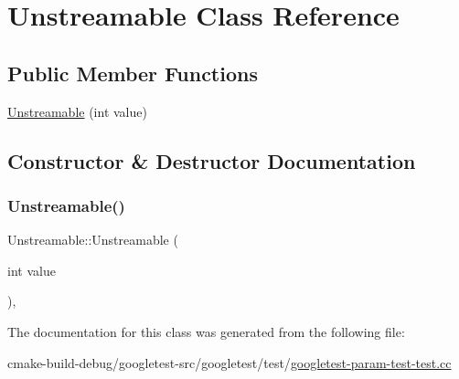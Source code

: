 \hypertarget{classUnstreamable}{}\section{Unstreamable Class Reference}
\label{classUnstreamable}
\subsection*{Public Member Functions}
\begin{DoxyCompactItemize}
\item 
\mbox{\hyperlink{classUnstreamable_aec8af0d0f78468a9094f1b36332a0842}{Unstreamable}} (int value)
\end{DoxyCompactItemize}


\subsection{Constructor \& Destructor Documentation}
\mbox{\label{classUnstreamable_aec8af0d0f78468a9094f1b36332a0842}} 
\subsubsection{\texorpdfstring{Unstreamable()}{Unstreamable()}}
{\footnotesize\ttfamily Unstreamable\+::\+Unstreamable (\begin{DoxyParamCaption}\item[{int}]{value }\end{DoxyParamCaption})\hspace{0.3cm}{\ttfamily [inline]}, {\ttfamily [explicit]}}



The documentation for this class was generated from the following file\+:\begin{DoxyCompactItemize}
\item 
cmake-\/build-\/debug/googletest-\/src/googletest/test/\mbox{\hyperlink{googletest-param-test-test_8cc}{googletest-\/param-\/test-\/test.\+cc}}\end{DoxyCompactItemize}
